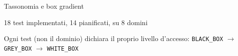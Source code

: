 \begin{frame}{Tassonomia e box gradient}
      \vspace{0.4em}
      \begin{center}
            \small \alert{18 test implementati}, 14 pianificati, su 8 domini
      \end{center}

      \vspace{0.4em}
      \begin{center}
            \small Ogni \alert{test} (non il dominio) dichiara il proprio livello d'accesso: \texttt{BLACK\_BOX} $\rightarrow$ \texttt{GREY\_BOX} $\rightarrow$ \texttt{WHITE\_BOX}
      \end{center}
\end{frame}